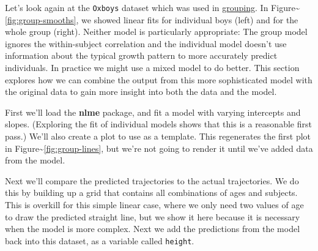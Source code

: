 Let's look again at the \texttt{Oxboys} dataset which was used in
\hyperref[sub:grouping]{grouping}. In
Figure\textasciitilde{}\ref{fig:group-smooths}, we showed linear fits
for individual boys (left) and for the whole group (right). Neither
model is particularly appropriate: The group model ignores the
within-subject correlation and the individual model doesn't use
information about the typical growth pattern to more accurately predict
individuals. In practice we might use a mixed model to do better. This
section explores how we can combine the output from this more
sophisticated model with the original data to gain more insight into
both the data and the model. 

First we'll load the \textbf{nlme} package, and fit a model with varying
intercepts and slopes. (Exploring the fit of individual models shows
that this is a reasonable first pass.) We'll also create a plot to use
as a template. This regenerates the first plot in
Figure\textasciitilde{}\ref{fig:group-lines}, but we're not going to
render it until we've added data from the model.

\begin{Shaded}
\begin{Highlighting}[]
\NormalTok{>}\StringTok{ } \NormalTok{, } \NormalTok{)}
\NormalTok{>}\StringTok{ }\StringTok{ }\StringTok{ } 
\NormalTok{+}\StringTok{  } \NormalTok{~}\StringTok{ } \NormalTok{+}\StringTok{ }\StringTok{ }
\NormalTok{>}\StringTok{ }\StringTok{ } \StringTok{ }
\NormalTok{+}\StringTok{   }\NormalTok{()}
\end{Highlighting}
\end{Shaded}

Next we'll compare the predicted trajectories to the actual
trajectories. We do this by building up a grid that contains all
combinations of ages and subjects. This is overkill for this simple
linear case, where we only need two values of age to draw the predicted
straight line, but we show it here because it is necessary when the
model is more complex. Next we add the predictions from the model back
into this dataset, as a variable called \texttt{height}.

